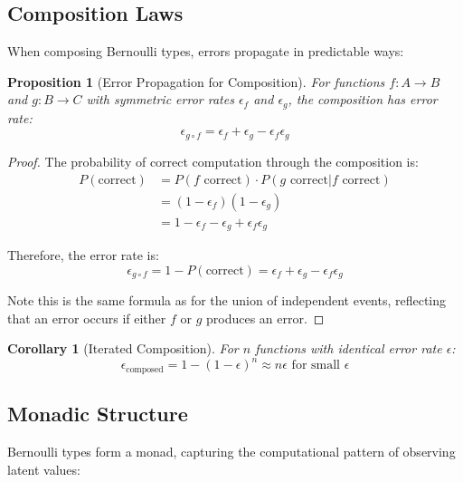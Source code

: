 \documentclass[11pt,final,hidelinks]{article}
\newtheorem{proposition}[theorem]{Proposition}
\newtheorem{corollary}[theorem]{Corollary}
\begin{document}
\subsection{Composition Laws}

When composing Bernoulli types, errors propagate in predictable ways:

\begin{proposition}[Error Propagation for Composition]
For functions $f: A \to B$ and $g: B \to C$ with symmetric error rates $\epsilon_f$ and $\epsilon_g$, the composition has error rate:
\begin{equation}
\epsilon_{g \circ f} = \epsilon_f + \epsilon_g - \epsilon_f \epsilon_g
\end{equation}
\end{proposition}

\begin{proof}
The probability of correct computation through the composition is:
\begin{align}
P(\text{correct}) &= P(f \text{ correct}) \cdot P(g \text{ correct} | f \text{ correct}) \\
&= (1 - \epsilon_f)(1 - \epsilon_g) \\
&= 1 - \epsilon_f - \epsilon_g + \epsilon_f \epsilon_g
\end{align}

Therefore, the error rate is:
\begin{equation}
\epsilon_{g \circ f} = 1 - P(\text{correct}) = \epsilon_f + \epsilon_g - \epsilon_f \epsilon_g
\end{equation}

Note this is the same formula as for the union of independent events, reflecting that an error occurs if either $f$ or $g$ produces an error.
\end{proof}

\begin{corollary}[Iterated Composition]
For $n$ functions with identical error rate $\epsilon$:
\begin{equation}
\epsilon_{\text{composed}} = 1 - (1 - \epsilon)^n \approx n\epsilon \text{ for small } \epsilon
\end{equation}
\end{corollary}

\subsection{Monadic Structure}

Bernoulli types form a monad, capturing the computational pattern of observing latent values:
\end{document}
